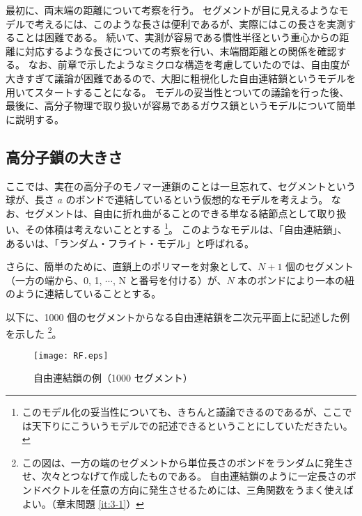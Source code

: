 \documentclass[a4paper,11pt]{ltjsarticle}
\begin{document}
最初に、両末端の距離について考察を行う。
セグメントが目に見えるようなモデルで考えるには、このような長さは便利であるが、実際にはこの長さを実測することは困難である。
続いて、実測が容易である慣性半径という重心からの距離に対応するような長さについての考察を行い、末端間距離との関係を確認する。
なお、前章で示したようなミクロな構造を考慮していたのでは、自由度が大きすぎて議論が困難であるので、大胆に粗視化した自由連結鎖というモデルを用いてスタートすることになる。
モデルの妥当性とついての議論を行った後、最後に、高分子物理で取り扱いが容易であるガウス鎖というモデルについて簡単に説明する。

%


\subsection{高分子鎖の大きさ}

ここでは、実在の高分子のモノマー連鎖のことは一旦忘れて、セグメントという球が、長さ $a$ のボンドで連結しているという仮想的なモデルを考えよう。
なお、セグメントは、自由に折れ曲がることのできる単なる結節点として取り扱い、その体積は考えないこととする
\footnote
{
このモデル化の妥当性についても、きちんと議論できるのであるが、ここでは天下りにこういうモデルでの記述できるということにしていただきたい。
}。
このようなモデルは、「自由連結鎖」、あるいは、「ランダム・フライト・モデル」と呼ばれる。

さらに、簡単のために、直鎖上のポリマーを対象として、$N+1$ 個のセグメント（一方の端から、0, 1, $\cdots$, N と番号を付ける）が、$N$ 本のボンドにより一本の紐のように連結していることとする。

以下に、1000 個のセグメントからなる自由連結鎖を二次元平面上に記述した例を示した
\footnote
{
この図は、一方の端のセグメントから単位長さのボンドをランダムに発生させ、次々とつなげて作成したものである。
自由連結鎖のように一定長さのボンドベクトルを任意の方向に発生させるためには、三角関数をうまく使えばよい。（章末問題 \ref{it:3-1}）
}。
\begin{figure}[htb]
	\begin{center}
		\texttt{[image: RF.eps]}
		\caption{自由連結鎖の例（1000 セグメント）}
		\label{fig: RF}
	\end{center}
\end{figure}
\end{document}
